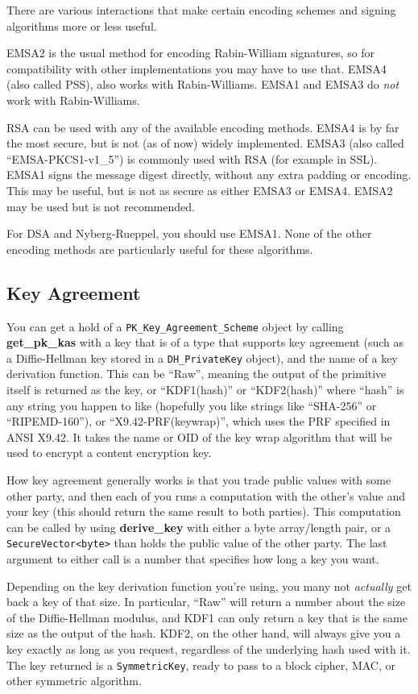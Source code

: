 \documentclass{article}
\newcommand{\function}[1]{\textbf{#1}}
\newcommand{\type}[1]{\texttt{#1}}
\begin{document}
There are various interactions that make certain encoding schemes and signing
algorithms more or less useful.

EMSA2 is the usual method for encoding Rabin-William signatures, so for
compatibility with other implementations you may have to use that. EMSA4 (also
called PSS), also works with Rabin-Williams. EMSA1 and EMSA3 do \emph{not} work
with Rabin-Williams.

RSA can be used with any of the available encoding methods. EMSA4 is by far the
most secure, but is not (as of now) widely implemented. EMSA3 (also called
``EMSA-PKCS1-v1\_5'') is commonly used with RSA (for example in SSL). EMSA1
signs the message digest directly, without any extra padding or encoding. This
may be useful, but is not as secure as either EMSA3 or EMSA4. EMSA2 may be used
but is not recommended.

For DSA and Nyberg-Rueppel, you should use EMSA1. None of the other encoding
methods are particularly useful for these algorithms.

\subsection{Key Agreement}

You can get a hold of a \type{PK\_Key\_Agreement\_Scheme} object by calling
\function{get\_pk\_kas} with a key that is of a type that supports key
agreement (such as a Diffie-Hellman key stored in a \type{DH\_PrivateKey}
object), and the name of a key derivation function. This can be ``Raw'',
meaning the output of the primitive itself is returned as the key, or
``KDF1(hash)'' or ``KDF2(hash)'' where ``hash'' is any string you happen to
like (hopefully you like strings like ``SHA-256'' or ``RIPEMD-160''), or
``X9.42-PRF(keywrap)'', which uses the PRF specified in ANSI X9.42. It takes
the name or OID of the key wrap algorithm that will be used to encrypt a
content encryption key.

How key agreement generally works is that you trade public values with some
other party, and then each of you runs a computation with the other's value and
your key (this should return the same result to both parties). This computation
can be called by using \function{derive\_key} with either a byte array/length
pair, or a \type{SecureVector<byte>} than holds the public value of the other
party. The last argument to either call is a number that specifies how long a
key you want.

Depending on the key derivation function you're using, you many not
\emph{actually} get back a key of that size. In particular, ``Raw'' will return
a number about the size of the Diffie-Hellman modulus, and KDF1 can only return
a key that is the same size as the output of the hash. KDF2, on the other
hand, will always give you a key exactly as long as you request, regardless of
the underlying hash used with it. The key returned is a \type{SymmetricKey},
ready to pass to a block cipher, MAC, or other symmetric algorithm.
\end{document}
